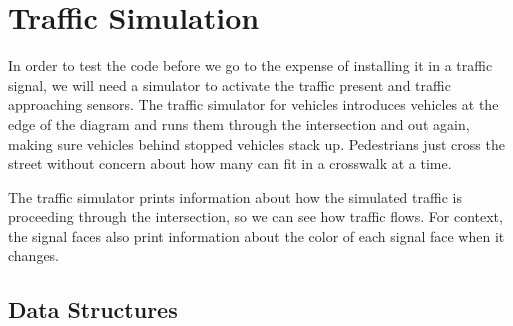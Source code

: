 \documentclass[letterpaper,twoside]{article}
\begin{document}
\section{Traffic Simulation}

In order to test the code before we go to the expense of installing
it in a traffic signal, we will need a simulator to activate the
traffic present and traffic approaching sensors.  The traffic simulator
for vehicles introduces vehicles at the edge of the diagram and
runs them through the intersection and out again, making sure vehicles
behind stopped vehicles stack up.  Pedestrians just cross the street
without concern about how many can fit in a crosswalk at a time.

The traffic simulator prints information about how the simulated
traffic is proceeding through the intersection, so we can see how
traffic flows.  For context, the signal faces also print information
about the color of each signal face when it changes.

\subsection{Data Structures}
\end{document}
